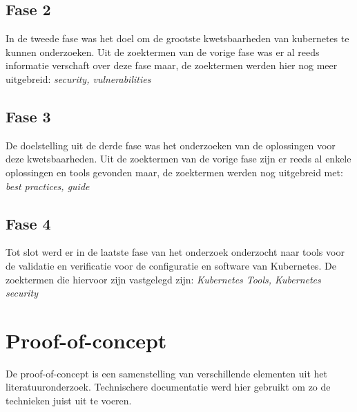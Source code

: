 \subsection{Fase 2}
In de tweede fase was het doel om de grootste kwetsbaarheden van kubernetes te kunnen onderzoeken. 
Uit de zoektermen van de vorige fase was er al reeds informatie verschaft over deze fase maar, de zoektermen werden hier nog meer uitgebreid: \textit{security, vulnerabilities}

\subsection{Fase 3}
De doelstelling uit de derde fase was het onderzoeken van de oplossingen voor deze kwetsbaarheden. 
Uit de zoektermen van de vorige fase zijn er reeds al enkele oplossingen en tools gevonden maar, de zoektermen werden nog uitgebreid met: \textit{best practices, guide}

\subsection{Fase 4}
Tot slot werd er in de laatste fase van het onderzoek onderzocht naar tools voor de validatie en verificatie voor de configuratie en software van Kubernetes. 
De zoektermen die hiervoor zijn vastgelegd zijn: \textit{Kubernetes Tools, Kubernetes security}


\section{Proof-of-concept}
De proof-of-concept is een samenstelling van verschillende elementen uit het literatuuronderzoek. Technischere documentatie werd hier gebruikt om zo de technieken juist uit te voeren. 

